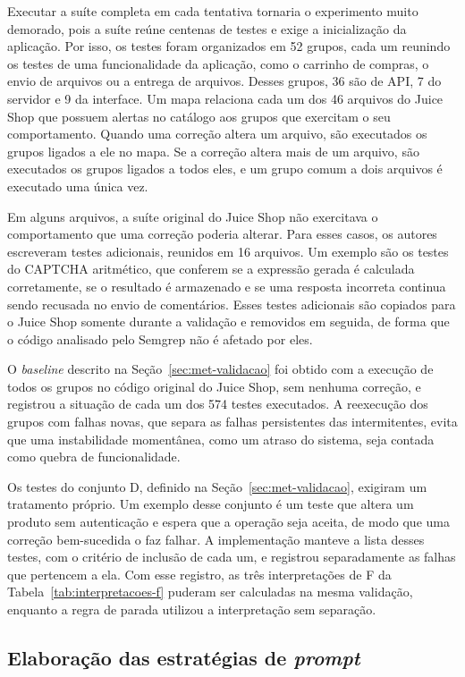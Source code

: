 Executar a suíte completa em cada tentativa tornaria o experimento muito demorado, pois a suíte reúne centenas de testes e exige a inicialização da aplicação. Por isso, os testes foram organizados em 52 grupos, cada um reunindo os testes de uma funcionalidade da aplicação, como o carrinho de compras, o envio de arquivos ou a entrega de arquivos. Desses grupos, 36 são de API, 7 do servidor e 9 da interface. Um mapa relaciona cada um dos 46 arquivos do Juice Shop que possuem alertas no catálogo aos grupos que exercitam o seu comportamento. Quando uma correção altera um arquivo, são executados os grupos ligados a ele no mapa. Se a correção altera mais de um arquivo, são executados os grupos ligados a todos eles, e um grupo comum a dois arquivos é executado uma única vez.

Em alguns arquivos, a suíte original do Juice Shop não exercitava o comportamento que uma correção poderia alterar. Para esses casos, os autores escreveram testes adicionais, reunidos em 16 arquivos. Um exemplo são os testes do CAPTCHA aritmético, que conferem se a expressão gerada é calculada corretamente, se o resultado é armazenado e se uma resposta incorreta continua sendo recusada no envio de comentários. Esses testes adicionais são copiados para o Juice Shop somente durante a validação e removidos em seguida, de forma que o código analisado pelo Semgrep não é afetado por eles.

O \textit{baseline} descrito na Seção~\ref{sec:met-validacao} foi obtido com a execução de todos os grupos no código original do Juice Shop, sem nenhuma correção, e registrou a situação de cada um dos 574 testes executados. A reexecução dos grupos com falhas novas, que separa as falhas persistentes das intermitentes, evita que uma instabilidade momentânea, como um atraso do sistema, seja contada como quebra de funcionalidade.

Os testes do conjunto D, definido na Seção~\ref{sec:met-validacao}, exigiram um tratamento próprio. Um exemplo desse conjunto é um teste que altera um produto sem autenticação e espera que a operação seja aceita, de modo que uma correção bem-sucedida o faz falhar. A implementação manteve a lista desses testes, com o critério de inclusão de cada um, e registrou separadamente as falhas que pertencem a ela. Com esse registro, as três interpretações de F da Tabela~\ref{tab:interpretacoes-f} puderam ser calculadas na mesma validação, enquanto a regra de parada utilizou a interpretação sem separação.

\subsection{Elaboração das estratégias de \textit{prompt}}
\label{sec:impl-prompts}

